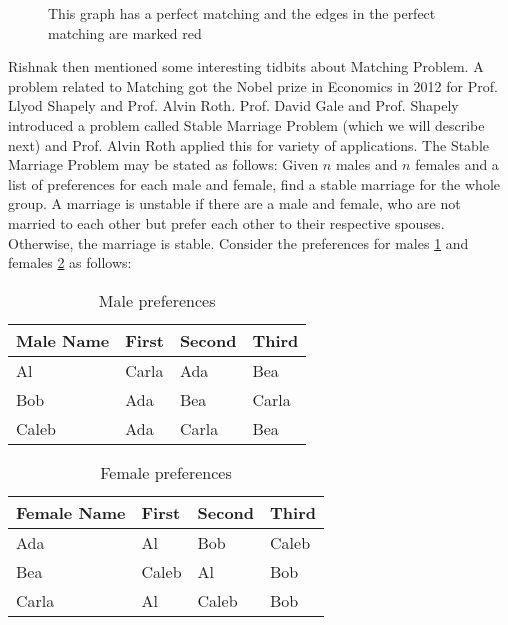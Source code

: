 \begin{figure}
\begin{center}
\caption{ This graph has a perfect matching and the edges in the perfect matching are marked red}\label{16g2}
\end{center}
\end{figure}
Rishnak then mentioned some interesting tidbits about Matching Problem.
A problem related to Matching got the Nobel prize in Economics in 2012 for Prof. Llyod Shapely and 
Prof. Alvin Roth.  Prof. David Gale and Prof. Shapely introduced a problem called Stable Marriage Problem (which we will describe next) and Prof. Alvin Roth applied this for variety of applications.
The Stable Marriage Problem may be stated as follows:
Given $n$ males and $n$ females and a list of preferences for each male and female, find a stable marriage for the whole group.
A marriage is unstable if there are a male and female, who are not married to each other but prefer each other to their respective spouses. Otherwise, the marriage is stable.
Consider the preferences for males \ref{16t1} and females \ref{16t2} as follows:
\begin{table}
\begin{center}
\begin{tabular}{ |p{3cm}||p{1.5cm}||p{1.5cm} || p{1.5cm}|| }
 \hline
 \hline
 Male Name & First&Second&Third\\
 \hline
 Al  & Carla    &Ada&Bea\\
Bob&Ada&Bea&Carla\\
Caleb&Ada&Carla&Bea\\
 
 
 \hline
\end{tabular}
\caption{Male preferences}\label{16t1}
\end{center}
\end{table}
\begin{table}
\begin{center}
\begin{tabular}{ |p{3cm}||p{1.5cm}||p{1.5cm} || p{1.5cm}|| }
 \hline
 \hline
 Female Name & First&Second&Third\\
 \hline
 Ada  & Al    &Bob&Caleb\\
Bea&Caleb&Al&Bob\\
Carla&Al&Caleb&Bob\\
 
 
 \hline
\end{tabular}
\caption{Female preferences}\label{16t2}
\end{center}
\end{table}

